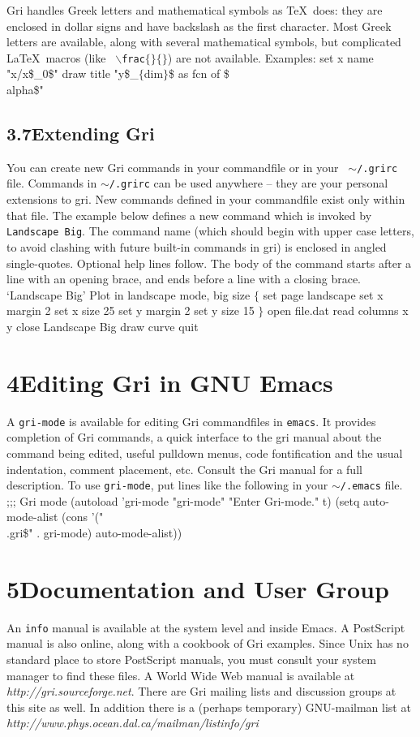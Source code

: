 Gri handles Greek letters and mathematical symbols as \TeX\ does: they
are enclosed in dollar signs and have backslash as the first
character.  Most Greek letters are available, along with several
mathematical symbols, but complicated La\TeX\ macros (like {\tt
$\backslash$frac$\lbrace\rbrace\lbrace\rbrace$}) are not available.
Examples:
\beginexample
set x name "x/x\$_0\$"
draw title "y\$_$\lbrace$dim$\rbrace$\$ as fcn of \$\\alpha\$"
\endexample



\subsection{3.7\quad Extending Gri}
You can create new Gri commands in your commandfile or in your {\tt
$\sim$/.grirc} file.  Commands in {\tt $\sim$/.grirc} can be used
anywhere -- they are your personal extensions to gri.  New commands
defined in your commandfile exist only within that file.  The example
below defines a new command which is invoked by {\tt Landscape Big}.
The command name (which should begin with upper case letters, to avoid
clashing with future built-in commands in gri) is enclosed in angled
single-quotes.  Optional help lines follow.  The body of the command
starts after a line with an opening brace, and ends before a line with
a closing brace.
\beginexample
`Landscape Big'
Plot in landscape mode, big size
$\lbrace$
    set page landscape
    set x margin 2
    set x size 25
    set y margin 2
    set y size 15
$\rbrace$
open file.dat
read columns x y
close
Landscape Big
draw curve
quit
\endexample

\section{4\quad Editing Gri in GNU Emacs}
A {\tt gri-mode} is available for editing Gri commandfiles in {\tt emacs}.
It provides completion of Gri commands, a quick interface to the gri manual
about the command being edited, useful pulldown menus, code
fontification and the usual indentation, comment placement, etc.
Consult the Gri manual for a full description.  To use {\tt gri-mode}, put
lines like the following in your {\tt $\sim$/.emacs} file.
\beginexample
;;; Gri mode
(autoload 'gri-mode "gri-mode" "Enter Gri-mode." t)
(setq auto-mode-alist 
    (cons '("\\.gri\$" . gri-mode) auto-mode-alist))
\endexample

\section{5\quad Documentation and User Group}
An {\tt info} manual is available at the system level and inside
Emacs.  A PostScript manual is also online, along with a cookbook of
Gri examples.  Since Unix has no standard place to store PostScript
manuals, you must consult your system manager to find these files.  A
World Wide Web manual is available at {\it
  http://gri.sourceforge.net}.
There are Gri mailing lists and discussion groups at this site as
well.  In addition there is a (perhaps temporary) GNU-mailman list
at {\it http://www.phys.ocean.dal.ca/mailman/listinfo/gri}


